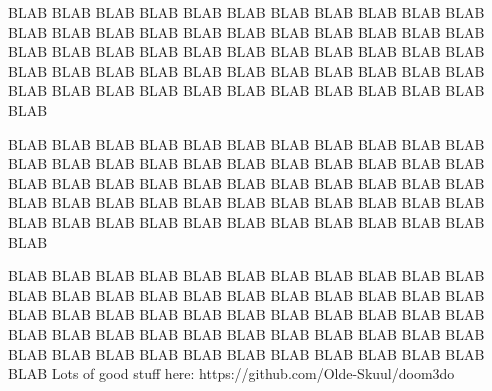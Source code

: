 BLAB BLAB BLAB BLAB BLAB BLAB BLAB BLAB BLAB BLAB BLAB BLAB BLAB BLAB 
BLAB BLAB BLAB BLAB BLAB BLAB BLAB BLAB BLAB BLAB BLAB BLAB BLAB BLAB 
BLAB BLAB BLAB BLAB BLAB BLAB BLAB BLAB BLAB BLAB BLAB BLAB BLAB BLAB 
BLAB BLAB BLAB BLAB BLAB BLAB BLAB BLAB BLAB BLAB BLAB BLAB BLAB BLAB\\ 
\par
BLAB BLAB BLAB BLAB BLAB BLAB BLAB BLAB BLAB BLAB BLAB BLAB BLAB BLAB 
BLAB BLAB BLAB BLAB BLAB BLAB BLAB BLAB BLAB BLAB BLAB BLAB BLAB BLAB 
BLAB BLAB BLAB BLAB BLAB BLAB BLAB BLAB BLAB BLAB BLAB BLAB BLAB BLAB 
BLAB BLAB BLAB BLAB BLAB BLAB BLAB BLAB BLAB BLAB BLAB BLAB BLAB BLAB \\
\par
BLAB BLAB BLAB BLAB BLAB BLAB BLAB BLAB BLAB BLAB BLAB BLAB BLAB BLAB 
BLAB BLAB BLAB BLAB BLAB BLAB BLAB BLAB BLAB BLAB BLAB BLAB BLAB BLAB 
BLAB BLAB BLAB BLAB BLAB BLAB BLAB BLAB BLAB BLAB BLAB BLAB BLAB BLAB 
BLAB BLAB BLAB BLAB BLAB BLAB BLAB BLAB BLAB BLAB BLAB BLAB BLAB BLAB 
Lots of good stuff here: https://github.com/Olde-Skuul/doom3do\\
\par
{}
\par

